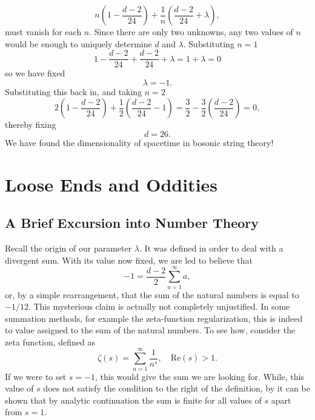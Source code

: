 \documentclass[a4paper,12pt]{article}
\numberwithin{equation}{section}
\begin{document}
\begin{equation}
n\left(1-\frac{d-2}{24}\right)+\frac{1}{n}\left(\frac{d-2}{24}+\lambda\right),
\end{equation}
must vanish for each $n$. Since there are only two unknowns, any two values of $n$ would be enough to uniquely determine $d$ and $\lambda$. Substituting $n=1$
\begin{equation}
1-\frac{d-2}{24}+\frac{d-2}{24}+\lambda = 1+\lambda = 0
\end{equation}
so we have fixed
\begin{equation}
\lambda = -1.
\end{equation}
Substituting this back in, and taking $n=2$
\begin{equation}
2\left(1-\frac{d-2}{24}\right)+\frac{1}{2}\left(\frac{d-2}{24}-1\right)=\frac{3}{2} -\frac{3}{2}\left(\frac{d-2}{24}\right) = 0,
\end{equation}
thereby fixing
\begin{equation}
d=26.
\end{equation}
We have found the dimensionality of spacetime in bosonic string theory! 

\section{Loose Ends and Oddities}\label{leo}
\subsection{A Brief Excursion into Number Theory}
Recall the origin of our parameter $\lambda$. It was defined in order to deal with a divergent sum. With its value now fixed, we are led to believe that
\begin{equation}
-1 = \frac{d-2}{2}\sum_{a=1}^\infty a,
\end{equation}
or, by a simple rearrangement, that the sum of the natural numbers is equal to $-1/12$. This mysterious claim is actually not completely unjustified. In some summation methods, for example the zeta-function regularization, this is indeed to value assigned to the sum of the natural numbers. To see how, consider the zeta function, defined as
\begin{equation}
\zeta(s) = \sum_{n=1}^\infty \frac{1}{n^s},\quad \text{Re}(s)>1.
\end{equation}
If we were to set $s=-1$, this would give the sum we are looking for. While, this value of $s$ does not satisfy the condition to the right of the definition, by it can be shown that by analytic continuation the sum is finite for all values of $s$ apart from $s=1$.
\end{document}
